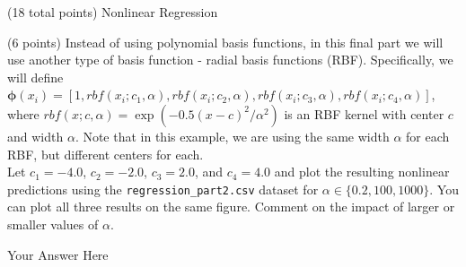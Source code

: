 \documentclass[12pt]{article}
\begin{document}
\begin{question}{(18 total points) Nonlinear Regression}
\begin{subquestion}
\end{subquestion}



%
%
\begin{subquestion}{(6 points) Instead of using polynomial basis functions, in this final part we will use another type of basis function - radial basis functions (RBF). 
Specifically, we will define $\boldsymbol{\phi}(x_i) = [1, rbf(x_i; c_1, \alpha), rbf(x_i; c_2, \alpha), rbf(x_i; c_3, \alpha), rbf(x_i; c_4, \alpha)]$, where $rbf(x; c, \alpha) =  \exp(-0.5(x-c)^2 / \alpha^2)$ is an RBF kernel with center $c$ and width $\alpha$. Note that in this example, we are using the same width $\alpha$ for each RBF, but different centers for each.\\ 
Let $c_1=-4.0$, $c_2=-2.0$, $c_3=2.0$, and $c_4=4.0$ and plot the resulting nonlinear predictions using the \texttt{regression\_part2.csv} dataset for $\alpha \in \{0.2, 100, 1000\}$. 
You can plot all three results on the same figure.
Comment on the impact of larger or smaller values of $\alpha$.
}


\begin{answerbox}{35em}
Your Answer Here
\end{answerbox}



\end{subquestion}



\end{question}






\clearpage
\end{document}
